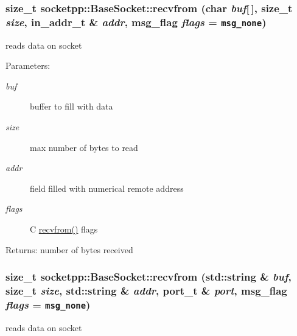 \begin{CompactItemize}
{\subsubsection[{recvfrom}]{\setlength{\rightskip}{0pt plus 5cm}size\_\-t socketpp::BaseSocket::recvfrom (char {\em buf}\mbox{[}$\,$\mbox{]}, \/  size\_\-t {\em size}, \/  in\_\-addr\_\-t \& {\em addr}, \/  msg\_\-flag {\em flags} = {\tt msg\_\-none})}}
\label{classsocketpp_1_1BaseSocket_0d4fad99bfe9601866a974f57c9f0370}


reads data on socket 

\begin{Desc}
\item[Parameters:]
\begin{description}
\item[{\em buf}]buffer to fill with data \item[{\em size}]max number of bytes to read \item[{\em addr}]field filled with numerical remote address \item[{\em flags}]C \hyperlink{classsocketpp_1_1BaseSocket_6a207860c0a1328dc05bea32bb62e81f}{recvfrom()} flags \end{description}
\end{Desc}
\begin{Desc}
\item[Returns:]number of bytes received \end{Desc}
\hypertarget{classsocketpp_1_1BaseSocket_b6059e85a3c981f39ec3b464d717d633}{
\subsubsection[{recvfrom}]{\setlength{\rightskip}{0pt plus 5cm}size\_\-t socketpp::BaseSocket::recvfrom (std::string \& {\em buf}, \/  size\_\-t {\em size}, \/  std::string \& {\em addr}, \/  port\_\-t \& {\em port}, \/  msg\_\-flag {\em flags} = {\tt msg\_\-none})}}
\label{classsocketpp_1_1BaseSocket_b6059e85a3c981f39ec3b464d717d633}


reads data on socket 


\end{CompactItemize}
